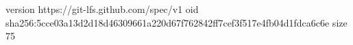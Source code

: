 version https://git-lfs.github.com/spec/v1
oid sha256:5cce03a13d2d18d46309661a220d67f762842ff7cef3f517e4fb04d1fdca6c6e
size 75
